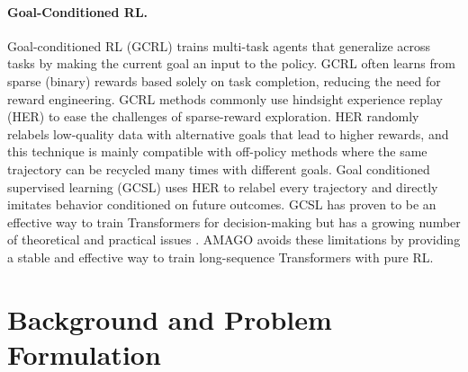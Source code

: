\paragraph{Goal-Conditioned RL.} Goal-conditioned RL (GCRL) \cite{kaelbling1993learning, pong2021goal} trains multi-task agents that generalize across tasks by making the current goal an input to the policy. GCRL often learns from sparse (binary) rewards based solely on task completion, reducing the need for reward engineering. GCRL methods commonly use hindsight experience replay (HER) \cite{andrychowicz2017hindsight, nair2018visual, nasiriany2021disco, eysenbach2020rewriting} to ease the challenges of sparse-reward exploration. HER randomly relabels low-quality data with alternative goals that lead to higher rewards, and this technique is mainly compatible with off-policy methods where the same trajectory can be recycled many times with different goals. Goal conditioned supervised learning (GCSL) \cite{ghosh2019learning, mandlekar2020iris, lynch2020learning, kumar2019reward, schmidhuber2019reinforcement, srivastava2019training} uses HER to relabel every trajectory and directly imitates behavior conditioned on future outcomes. GCSL has proven to be an effective way to train Transformers for decision-making \cite{janner2021reinforcement, chen2021decision, zheng2022online, lee2022multi, cui2022play, xu2022prompting} but has a growing number of theoretical and practical issues \cite{eysenbach2022imitating, paster2022you, brandfonbrener2022does, yang2022rethinking}. AMAGO avoids these limitations by providing a stable and effective way to train long-sequence Transformers with pure RL. 

\section{Background and Problem Formulation}
\label{sec:background}

